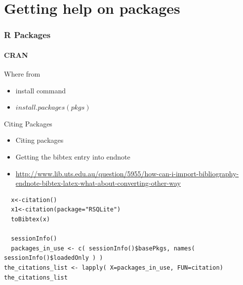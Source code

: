 \documentclass[10pt,handout,english]{beamer}\usepackage[]{graphicx}\usepackage[]{color}
\begin{document}
\section*{Getting help on packages}
\begin{frame}[fragile]
  \frametitle{R Packages}
  \framesubtitle{CRAN}
  
   \begin{block}{Where from}
  \begin{itemize} 
  \item install command
  \item $install.packages(pkgs)$
  \end{itemize}
  \end{block}

  \begin{block}{Citing Packages}
  \begin{itemize}
 \item Citing packages
 \item Getting the bibtex entry into endnote
 \item \url{http://www.lib.uts.edu.au/question/5955/how-can-i-import-bibliography-endnote-bibtex-latex-what-about-converting-other-way}
   \end{itemize}
  \end{block}
\begin{lstlisting}
  x<-citation()
  x1<-citation(package="RSQLite")
  toBibtex(x)
  
  sessionInfo()
  packages_in_use <- c( sessionInfo()$basePkgs, names( sessionInfo()$loadedOnly ) )
the_citations_list <- lapply( X=packages_in_use, FUN=citation)
the_citations_list
\end{lstlisting}


\end{frame}
\end{document}
